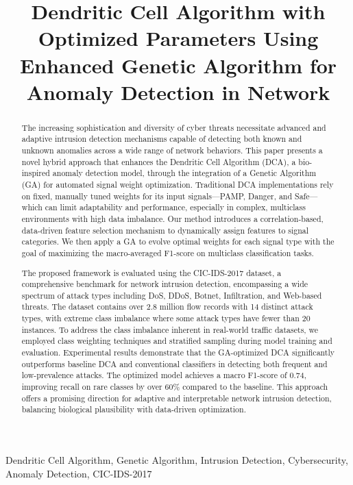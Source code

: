 \documentclass[conference]{IEEEtran}
\title{Dendritic Cell Algorithm with Optimized Parameters Using
Enhanced Genetic Algorithm for Anomaly Detection in Network}
\author{\IEEEauthorblockN{1\textsuperscript{st} John Doe}
  \IEEEauthorblockA{\textit{Department of Computer Science} \\
    \textit{University of Example}\\
    City, Country \\
  email@example.com}
}
\begin{document}
\maketitle

\begin{abstract}
  The increasing sophistication and diversity of cyber threats
  necessitate advanced and adaptive intrusion detection mechanisms
  capable of detecting both known and unknown anomalies across a wide
  range of network behaviors. This paper presents a novel hybrid
  approach that enhances the Dendritic Cell Algorithm (DCA), a
  bio-inspired anomaly detection model, through the integration of a
  Genetic Algorithm (GA) for automated signal weight optimization.
  Traditional DCA implementations rely on fixed, manually tuned
  weights for its input signals—PAMP, Danger, and Safe—which can
  limit adaptability and performance, especially in complex,
  multiclass environments with high data imbalance. Our method
  introduces a correlation-based, data-driven feature selection
  mechanism to dynamically assign features to signal categories. We
  then apply a GA to evolve optimal weights for each signal type with
  the goal of maximizing the macro-averaged F1-score on multiclass
  classification tasks.

  The proposed framework is evaluated using the CIC-IDS-2017 dataset,
  a comprehensive benchmark for network intrusion detection,
  encompassing a wide spectrum of attack types including DoS, DDoS,
  Botnet, Infiltration, and Web-based threats. The dataset contains over
  2.8 million flow records with 14 distinct attack types, with extreme class
  imbalance where some attack types have fewer than 20 instances. To address the class
  imbalance inherent in real-world traffic datasets, we employed class weighting
  techniques and stratified sampling during model training and evaluation.
  Experimental results demonstrate that the
  GA-optimized DCA significantly outperforms baseline DCA and
  conventional classifiers in detecting both frequent and
  low-prevalence attacks. The optimized model achieves a macro
  F1-score of 0.74, improving recall on rare classes by over 60\%
  compared to the baseline. This approach offers a promising
  direction for adaptive and interpretable network intrusion
  detection, balancing biological plausibility with data-driven optimization.
\end{abstract}

\begin{IEEEkeywords}
  Dendritic Cell Algorithm, Genetic Algorithm, Intrusion Detection,
  Cybersecurity, Anomaly Detection, CIC-IDS-2017
\end{IEEEkeywords}
\end{document}
